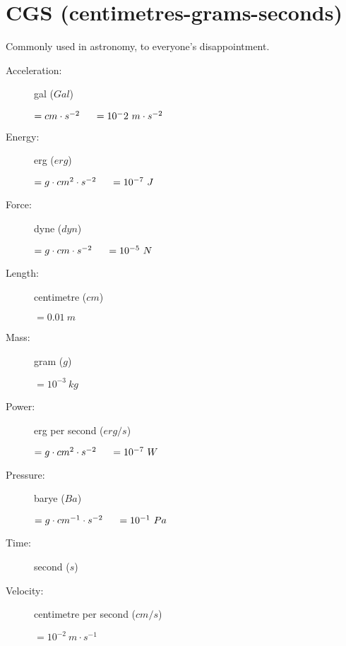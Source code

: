 \section{CGS (centimetres-grams-seconds)}

Commonly used in astronomy, to everyone's disappointment.
\begin{description}

\item[Acceleration:] gal ($Gal$)
\begin{itemize}
\items $=cm\cdot s^{-2} \tab[0.5cm]=10^-2\  m \cdot s^{-2}$
\end{itemize}

\item[Energy:] erg ($erg$)
\begin{itemize}
\items $=g\cdot cm^{2}\cdot s^{-2} \tab[0.5cm]=10^{-7}\ J$
\end{itemize}

\item[Force:] dyne ($dyn$)
\begin{itemize}
\items $=g\cdot cm \cdot s^{-2} \tab[0.5cm]=10^{-5}\ N$
\end{itemize}

\item[Length:] centimetre ($cm$)
\begin{itemize}
\items $= 0.01\ m$
\end{itemize}				

\item[Mass:] gram ($g$)
\begin{itemize}
\items $=10^{-3}\  kg$
\end{itemize}

\item[Power:] erg per second ($erg/s$)
\begin{itemize}
\items $=g\cdot cm^{2}\cdot s^{-2} \tab[0.5cm]= 10^{-7}\ W$
\end{itemize}

\item[Pressure:] barye ($Ba$)
\begin{itemize}
\items $=g\cdot cm^{-1}\cdot s^{-2} \tab[0.5cm]= 10^{-1}\ Pa$
\end{itemize}
                
\item[Time:] second ($s$)

\item[Velocity:] centimetre per second ($cm/s$)
\begin{itemize}
\items $= 10^{-2}\ m\cdot s^{-1}$
\end{itemize}


\end{description}
